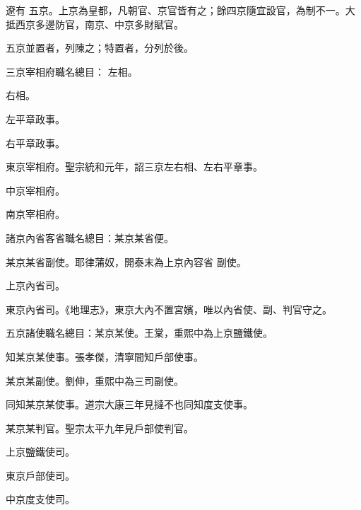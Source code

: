 
\begin{pinyinscope}

 遼有
 五京。上京為皇都，凡朝官、京官皆有之；餘四京隨宜設官，為制不一。大抵西京多邊防官，南京、中京多財賦官。



 五京並置者，列陳之；特置者，分列於後。



 三京宰相府職名總目：
 左相。



 右相。



 左平章政事。



 右平章政事。



 東京宰相府。聖宗統和元年，詔三京左右相、左右平章事。



 中京宰相府。



 南京宰相府。



 諸京內省客省職名總目：某京某省便。



 某京某省副使。耶律蒲奴，開泰末為上京內容省
 副使。



 上京內省司。



 東京內省司。《地理志》，東京大內不置宮嬪，唯以內省使、副、判官守之。



 五京諸使職名總目：某京某使。王棠，重熙中為上京鹽鐵使。



 知某京某使事。張孝傑，清寧間知戶部使事。



 某京某副使。劉伸，重熙中為三司副使。



 同知某京某使事。道宗大康三年見撻不也同知度支使事。



 某京某判官。聖宗太平九年見戶部使判官。



 上京鹽鐵使司。



 東京戶部使司。



 中京度支使司。




\end{pinyinscope}
